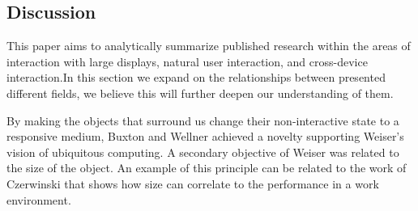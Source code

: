 \subsection{Discussion}
This paper aims to analytically summarize published research within the areas of interaction with large displays, natural user interaction, and cross-device interaction.In this section we expand on the relationships between presented different fields, we believe this will further deepen our understanding of them.

By making the objects that surround us change their non-interactive state to a responsive medium, Buxton\cite{Buxton:2000} and Wellner\cite{Wellner:1993} achieved a novelty supporting Weiser's vision of ubiquitous computing. A secondary objective of Weiser was related to the size of the object. An example of this principle can be related to the work of Czerwinski\cite{Czerwinski:2003} that shows how size can correlate to the performance in a work environment.

